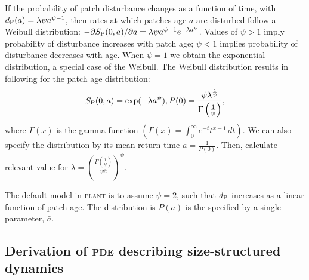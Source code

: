 \documentclass[10pt,twoside]{article}
\newcommand{\plant}{\textsc{plant}}
\begin{document}
If the probability of patch disturbance changes as a function of time,
with \(d_{\rm P}(a) = \lambda \psi a^{\psi-1}\), then rates at which
patches age \(a\) are disturbed follow a Weibull distribution:
\(-\partial S_{\rm P}(0, a)/ \partial a = \lambda \psi a^{\psi -1}e^{-\lambda a^\psi}\).
Values of \(\psi>1\) imply probability of disturbance increases with
patch age; \(\psi<1\) implies probability of disturbance decreases with
age. When \(\psi = 1\) we obtain the exponential distribution, a special
case of the Weibull. The Weibull distribution results in following for
the patch age distribution:
\[S_{\rm P}(0, a) = \exp(-\lambda a^\psi), P(0) = \frac{\psi \lambda^{\frac1{\psi}}}{\Gamma\left(\frac1{\psi}\right)},\]
where \(\Gamma(x)\) is the gamma function
\(\left(\Gamma(x) = \int_{0}^{\infty}e^{-t}t^{x-1} \, dt\right)\). We can
also specify the distribution by its mean return time
\(\bar{a} = \frac1{P(0)}\). Then, calculate relevant value for
\(\lambda = \left(\frac{\Gamma\left(\frac1{\psi}\right)}{\psi \bar{a}}\right)^{\psi}\).

The default model in {\plant} is to assume $\psi=2$, such that \(d_{\rm P}\) increases as
a linear function of patch age. The distribution is $P(a)$ is the specified by a
single parameter, $\bar{a}$.


\subsection{Derivation of \textsc{pde} describing size-structured
dynamics}\label{derivation-of-pde-describing-size-structured-dynamics}
\end{document}
